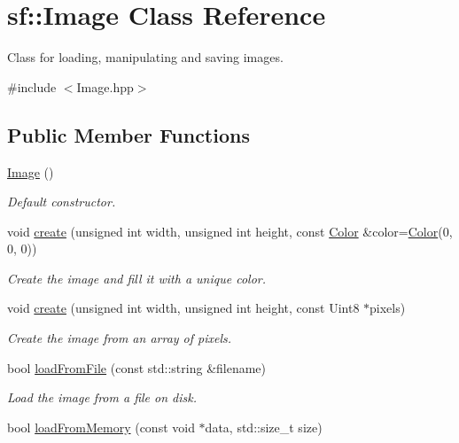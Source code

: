 \hypertarget{classsf_1_1Image}{\section{sf\-:\-:Image Class Reference}
\label{classsf_1_1Image}
}


Class for loading, manipulating and saving images.  




{\ttfamily \#include $<$Image.\-hpp$>$}

\subsection*{Public Member Functions}
\begin{DoxyCompactItemize}
\item 
\hyperlink{classsf_1_1Image_abb4caf3cb167b613345ebe36fc883f12}{Image} ()
\begin{DoxyCompactList}\small\item\em Default constructor. \end{DoxyCompactList}\item 
void \hyperlink{classsf_1_1Image_a2a67930e2fd9ad97cf004e918cf5832b}{create} (unsigned int width, unsigned int height, const \hyperlink{classsf_1_1Color}{Color} \&color=\hyperlink{classsf_1_1Color}{Color}(0, 0, 0))
\begin{DoxyCompactList}\small\item\em Create the image and fill it with a unique color. \end{DoxyCompactList}\item 
void \hyperlink{classsf_1_1Image_a1c2b960ea12bdbb29e80934ce5268ebf}{create} (unsigned int width, unsigned int height, const Uint8 $\ast$pixels)
\begin{DoxyCompactList}\small\item\em Create the image from an array of pixels. \end{DoxyCompactList}\item 
bool \hyperlink{classsf_1_1Image_a9e4f2aa8e36d0cabde5ed5a4ef80290b}{load\-From\-File} (const std\-::string \&filename)
\begin{DoxyCompactList}\small\item\em Load the image from a file on disk. \end{DoxyCompactList}\item 
bool \hyperlink{classsf_1_1Image_aaa6c7afa5851a51cec6ab438faa7354c}{load\-From\-Memory} (const void $\ast$data, std\-::size\-\_\-t size)

\end{DoxyCompactItemize}
